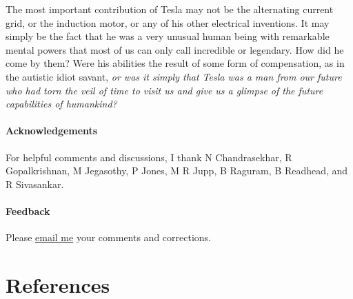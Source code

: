 \documentclass[
  11pt,
  a4paper,
]{article}
\begin{document}
The most important contribution of Tesla may not be the alternating
current grid, or the induction motor, or any of his other electrical
inventions. It may simply be the fact that he was a very unusual human
being with remarkable mental powers that most of us can only call
incredible or legendary. How did he come by them? Were his abilities the
result of some form of compensation, as in the autistic idiot savant,
\emph{or was it simply that Tesla was a man from our future who had torn
the veil of time to visit us and give us a glimpse of the future
capabilities of humankind?}

\hypertarget{acknowledgements}{%
\paragraph{Acknowledgements}\label{acknowledgements}}

For helpful comments and discussions, I thank N Chandrasekhar, R
Gopalkrishnan, M Jegasothy, P Jones, M R Jupp, B Raguram, B Readhead,
and R Sivasankar.

\hypertarget{feedback}{%
\paragraph{Feedback}\label{feedback}}

Please \href{mailto:feedback.swanlotus@gmail.com}{email me} your
comments and corrections.


\hypertarget{bibliography}{%
\section*{References}\label{bibliography}}
\end{document}
